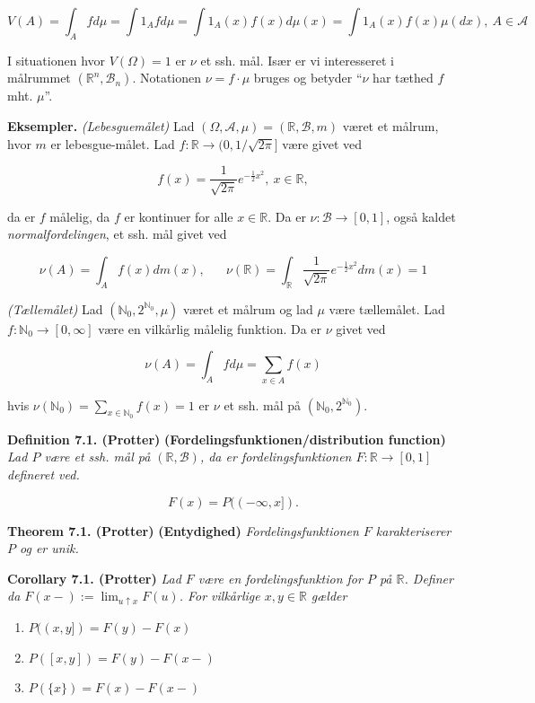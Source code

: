 \documentclass[a4paper,10pt,openany]{book}
\providecommand{\tightlist}{%
 \setlength{\itemsep}{0pt}\setlength{\parskip}{0pt}}
\begin{document}
\[
V(A)=\int_A f d\mu=\int 1_A fd\mu=\int 1_A(x)f(x)d\mu(x)=\int1_A(x)f(x)\mu(dx),\ A\in\mathcal{A}
\]

I situationen hvor \(V(\Omega)=1\) er \(\nu\) et ssh. mål. Især er vi interesseret i målrummet \((\mathbb{R}^n,\mathcal{B}_n)\). Notationen \(\nu =f\cdot \mu\) bruges og betyder ``\(\nu\) har tæthed \(f\) mht. \(\mu\)''.

\textbf{Eksempler.} \emph{(Lebesguemålet)} Lad \((\Omega,\mathcal{A},\mu)=(\mathbb{R},\mathcal{B},m)\) været et målrum, hvor \(m\) er lebesgue-målet. Lad \(f : \mathbb{R}\to (0,1/\sqrt{2\pi}]\) være givet ved

\[
f(x)=\frac{1}{\sqrt{2\pi}}e^{-\frac{1}{2}x^2},\ x\in\mathbb{R},
\]

da er \(f\) målelig, da \(f\) er kontinuer for alle \(x\in\mathbb{R}\). Da er \(\nu : \mathcal{B} \to [0,1]\), også kaldet \emph{normalfordelingen}, et ssh. mål givet ved

\[
\nu(A)=\int_A f(x) dm(x),\hspace{20pt} \nu(\mathbb{R})=\int_{\mathbb{R}}\frac{1}{\sqrt{2\pi}}e^{-\frac{1}{2}x^2}dm(x)=1
\]

\emph{(Tællemålet)} Lad \((\mathbb{N}_0,2^{\mathbb{N}_0},\mu)\) været et målrum og lad \(\mu\) være tællemålet. Lad \(f : \mathbb{N}_0 \to [0,\infty]\) være en vilkårlig målelig funktion. Da er \(\nu\) givet ved

\[
\nu(A)=\int_A fd\mu=\sum_{x\in A}f(x)
\]

hvis \(\nu(\mathbb{N}_0)=\sum_{x\in\mathbb{N}_0}f(x)=1\) er \(\nu\) et ssh. mål på \((\mathbb{N}_0,2^{\mathbb{N}_0})\).

\textbf{Definition 7.1. (Protter)} \textbf{(Fordelingsfunktionen/distribution function)} \emph{Lad \(P\) være et ssh. mål på \((\mathbb{R},\mathcal{B})\), da er fordelingsfunktionen \(F : \mathbb{R}\to [0,1]\) defineret ved.}

\[
F(x)=P((-\infty,x]).
\]

\textbf{Theorem 7.1. (Protter)} \textbf{(Entydighed)} \emph{Fordelingsfunktionen \(F\) karakteriserer \(P\) og er unik.}

\textbf{Corollary 7.1. (Protter)} \emph{Lad \(F\) være en fordelingsfunktion for \(P\) på \(\mathbb{R}\). Definer da \(F(x-):=\lim_{u\uparrow x}F(u)\). For vilkårlige \(x,y\in\mathbb{R}\) gælder}

\begin{enumerate}
\def\labelenumi{\roman{enumi}.}
\tightlist
\item
  \(P((x,y])=F(y)-F(x)\)
\item
  \(P([x,y])=F(y)-F(x-)\)
\item
  \(P(\{x\})=F(x)-F(x-)\)
\end{enumerate}
\end{document}
